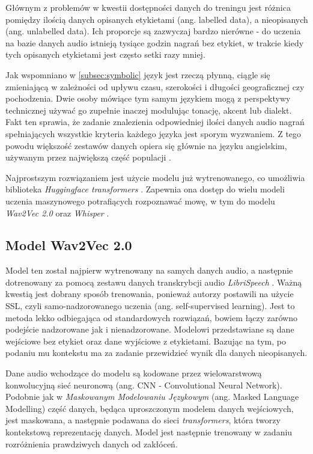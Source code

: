 Głównym z problemów w kwestii dostępności danych do treningu jest różnica pomiędzy ilością danych opisanych etykietami (ang. labelled data), a nieopisanych (ang. unlabelled data). Ich proporcje są zazwyczaj bardzo nierówne - do uczenia na bazie danych audio istnieją tysiące godzin nagrań bez etykiet, w trakcie kiedy tych opisanych etykietami jest często setki razy mniej. 

Jak wspomniano w \ref{subsec:symbolic} język jest rzeczą płynną, ciągle się zmieniającą w zależności od upływu czasu, szerokości i długości geograficznej czy pochodzenia. Dwie osoby mówiące tym samym językiem mogą z perspektywy technicznej używać go zupełnie inaczej modulując tonację, akcent lub dialekt. Fakt ten sprawia, że zadanie znalezienia odpowiedniej ilości danych audio nagrań spełniających wszystkie kryteria każdego języka jest sporym wyzwaniem. Z tego powodu większość zestawów danych opiera się głównie na języku angielskim, używanym przez największą część populacji \cite{mostspoken}. 

Najprostszym rozwiązaniem jest użycie modelu już wytrenowanego, co umożliwia biblioteka \textit{Huggingface transformers} \cite{hf}. Zapewnia ona dostęp do wielu modeli uczenia maszynowego potrafiących rozpoznawać mowę, w tym do modelu \textit{Wav2Vec 2.0} \cite{baevski2020wav2vec} oraz \textit{Whisper} \cite{radford2022robust}.


\subsection{Model Wav2Vec 2.0}
\label{subsec:wav2vec}

Model ten został najpierw wytrenowany na samych danych audio, a następnie dotrenowany za pomocą zestawu danych transkrybcji audio \textit{LibriSpeech} \cite{libri}. Ważną kwestią jest dobrany sposób trenowania, ponieważ autorzy postawili na użycie SSL, czyli samo-nadzorowanego uczenia (ang. self-supervised learning). Jest to metoda lekko odbiegająca od standardowych rozwiązań, bowiem łączy zarówno podejście nadzorowane jak i nienadzorowane. Modelowi przedstawiane są dane wejściowe bez etykiet oraz dane wyjściowe z etykietami. Bazując na tym, po podaniu mu kontekstu ma za zadanie przewidzieć wynik dla danych nieopisanych. 

Dane audio wchodzące do modelu są kodowane przez wielowarstwową konwolucyjną sieć neuronową (ang. CNN - Convolutional Neural Network). Podobnie jak w \textit{Maskowanym Modelowaniu Językowym} (ang. Masked Language Modelling) część danych, będąca uproszczonym modelem danych wejściowych, jest maskowana, a następnie podawana do sieci \textit{transformers}, która tworzy kontekstową reprezentację danych. Model jest następnie trenowany w zadaniu rozróżnienia prawdziwych danych od zakłóceń. 

